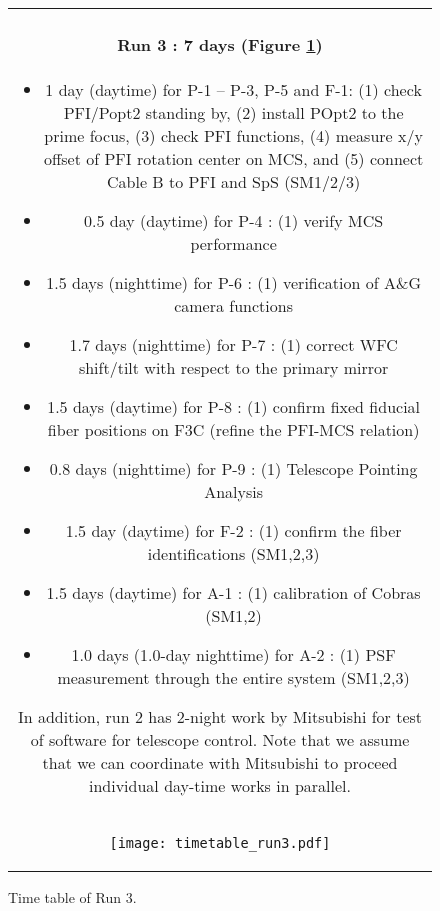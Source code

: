 \begin{figure}[!ht]
\begin{center}
\begin{tabular}{c}
\begin{minipage}{0.95\hsize}
\paragraph{Run 3 : 7 days  (Figure \ref{fig:run3})}
	\begin{itemize}
	\item 1 day (daytime) for P-1 -- P-3, P-5  and F-1:
	(1) check PFI/Popt2 standing by,
	(2) install POpt2 to the prime focus,
	(3) check PFI functions,
	(4) measure x/y offset of PFI rotation center on MCS, and
	(5) connect Cable B to PFI and SpS (SM1/2/3)
	\item 0.5 day (daytime) for P-4 :
	(1) verify  MCS performance
	\item 1.5 days (nighttime) for P-6 :
	(1) verification of A\&G camera functions 
	\item 1.7 days (nighttime) for P-7 :
	(1) correct WFC shift/tilt with respect to the primary mirror
	\item 1.5 days (daytime) for P-8 :  
	(1) confirm fixed fiducial fiber positions on F3C (refine the PFI-MCS relation)
	\item 0.8 days (nighttime) for P-9 :
	(1) Telescope Pointing Analysis
	\item 1.5 day (daytime) for F-2 :  
	(1) confirm  the fiber identifications (SM1,2,3)
	\item 1.5 days (daytime) for A-1 : 
	(1) calibration of Cobras (SM1,2)
	\item 1.0 days (1.0-day nighttime) for A-2 : 
	(1) PSF measurement through the entire system (SM1,2,3)	
\end{itemize}
In addition, run 2 has 2-night work by Mitsubishi for test of software for telescope control.
Note that we assume that we can coordinate with Mitsubishi to proceed individual day-time works in parallel.
\end{minipage} \\
\begin{minipage}{0.8\hsize}
	\begin{center}
	\vspace*{5mm}
	\texttt{[image: timetable\_run3.pdf]}
	\end{center}
	\vspace*{-5mm}
	\caption{Time table of Run 3.}
	\label{fig:run3}
\end{minipage}
\end{tabular}
\end{center}
\end{figure}

